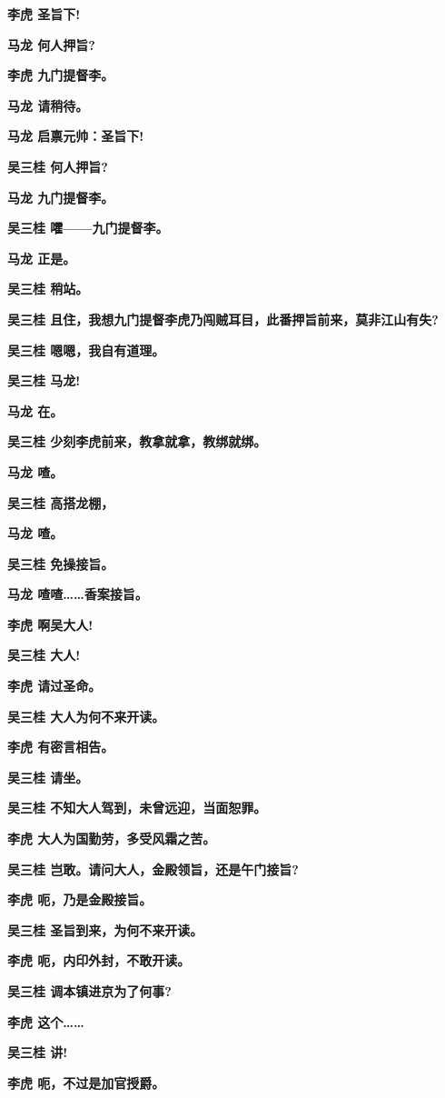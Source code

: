 \textbf{李虎 圣旨下!}

\textbf{马龙 何人押旨?}

\textbf{李虎 九门提督李。}

\textbf{马龙 请稍待。}

\textbf{马龙 启禀元帅：圣旨下!}

\textbf{吴三桂 何人押旨?}

\textbf{马龙 九门提督李。}

\textbf{吴三桂 嚯------九门提督李。}

\textbf{马龙 正是。}

\textbf{吴三桂 稍站。}

\textbf{吴三桂
且住，我想九门提督李虎乃闯贼耳目，此番押旨前来，莫非江山有失?}

\textbf{吴三桂 嗯嗯，我自有道理。}

\textbf{吴三桂 马龙!}

\textbf{马龙 在。}

\textbf{吴三桂 少刻李虎前来，教拿就拿，教绑就绑。}

\textbf{马龙 喳。}

\textbf{吴三桂 高搭龙棚，}

\textbf{马龙 喳。}

\textbf{吴三桂 免操接旨。}

\textbf{马龙 喳喳\ldots{}\ldots{}香案接旨。}

\textbf{李虎 啊吴大人!}

\textbf{吴三桂 大人!}

\textbf{李虎 请过圣命。}

\textbf{吴三桂 大人为何不来开读。}

\textbf{李虎 有密言相告。}

\textbf{吴三桂 请坐。}

\textbf{吴三桂 不知大人驾到，未曾远迎，当面恕罪。}

\textbf{李虎 大人为国勤劳，多受风霜之苦。}

\textbf{吴三桂 岂敢。请问大人，金殿领旨，还是午门接旨?}

\textbf{李虎 呃，乃是金殿接旨。}

\textbf{吴三桂 圣旨到来，为何不来开读。}

\textbf{李虎 呃，内印外封，不敢开读。}

\textbf{吴三桂 调本镇进京为了何事?}

\textbf{李虎 这个\ldots{}\ldots{}}

\textbf{吴三桂 讲!}

\textbf{李虎 呃，不过是加官授爵。}


